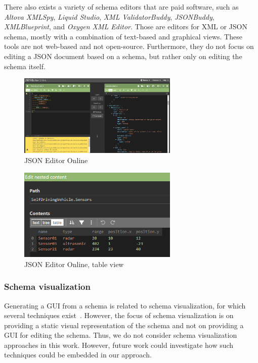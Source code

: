 There also exists a variety of schema editors that are paid software, such as \textit{Altova XMLSpy}\cite{altovaEditorXMLSpy},
\textit{Liquid Studio}\cite{liquidtechnologiesJSONSchema}, \textit{XML ValidatorBuddy}\cite{xmlbuddyEditorValidator},
\textit{JSONBuddy}\cite{jsonbuddyJSONSchema}, \textit{XMLBlueprint}\cite{xmlblueprintEditorXMLBlueprint},
and \textit{Oxygen XML Editor}\cite{oxygenxmlCompleteSolution}.
Those are editors for XML or JSON schema, mostly with a combination of text-based and graphical views.
These tools are not web-based and not open-source.
Furthermore, they do not focus on editing a JSON document based on a schema,
but rather only on editing the schema itself.
\begin{figure}[htb]
	\centering
	\includegraphics[width=3in]{figures/jsoneditoronline}
	\caption{JSON Editor Online}
	\label{fig:jsoneditoronline}
\end{figure}
\begin{figure}[htb]
	\centering
	\includegraphics[width=3in]{figures/jsoneditoronline-table}
	\caption{JSON Editor Online, table view}
	\label{fig:jsoneditoronline_table}
\end{figure}


\subsubsection{Schema visualization}\label{subsubsec:schema-visualization}
Generating a GUI from a schema is related to schema visualization, for which several techniques exist~\cite{Frasincar2006, SILVA201928, 10.1145/1317353.1317362, 1173142}.
However, the focus of schema visualization is on providing a static visual representation of the schema
and not on providing a GUI for editing the schema.
Thus, we do not consider schema visualization approaches in this work.
However, future work could investigate how such techniques could be embedded in our approach.


